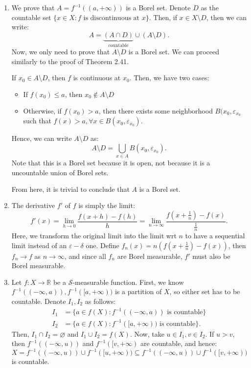 \begin{enumerate}[label=\textbf{2B.\arabic*}]
\item We prove that \( A = f^{-1}((a, +\infty)) \) is a Borel set. 
  Denote \(
  D\) as the countable set \( \{x \in X: f\text{ is discontinuous at } x\}   \).
  Then, if \( x \in X \setminus D \), then we can write:
  \[
    A = \underbrace{(A \cap D)}_{\text{countable}} \cup (A
    \setminus D)
  .\] 
  Now, we only need to prove that \( A\setminus D \) is a Borel set. We can
  proceed similarly to the proof of Theorem 2.41.

  If \( x_{0} \in A \setminus D \), then \( f \) is continuous at \( x_{0} \).
  Then, we have two cases:
  \begin{itemize}
  \item If \( f(x_{0}) \le  a \), then \( x_{0} \not\in A \setminus D \)
  \item Otherwise, if \( f(x_{0}) > a \), then there exists some neighborhood \(
    B(x_{0}, \varepsilon_{x_{0}}\) such that \( f(x) > a, \forall x \in B(x_{0},
    \varepsilon_{x_{0}}) \).
  \end{itemize}
  Hence, we can write \( A\setminus D \) as:
  \[
    A \setminus D = \bigcup_{x \in A} B(x_{0}, \varepsilon_{x_{0}})
  .\] 
  Note that this is a Borel set because it is open, not because it is a
  uncountable union of Borel sets.

  From here, it is trivial to conclude that \( A \) is a Borel set.
\item The derivative \( f' \) of \( f \) is simply the limit:
  \[
    f'(x) = \lim_{h \to 0} \frac{f(x+h)-f(h)}{h} = \lim_{n \to \infty} \frac{f
    \left( x +  \frac{1}{n} \right) - f(x) }{\frac{1}{n}}
  .\] 
  Here, we transform the original limit into the limit wrt \( n \) to have a
  sequential limit instead of an \( \varepsilon-\delta \) one. Define \(
  f_{n}(x) = n \left( f \left( x + \frac{1}{n} \right) - f(x) \right)  \), then
  \( f_{n} \to  f \) as \( n \to \infty \), and since all \( f_{n} \) are Borel
  measurable, \( f' \) must also be Borel measurable.

\item Let \( f: X \to \mathbb{R} \) be a \( \mathcal{S} \)-measurable function.
  First, we know \( f^{-1}((-\infty, a)), f^{-1}([a, +\infty)) \) is a partition
  of \( X \), so either set has to be countable. Denote \( I_{1}, I_{2} \) as
  follows:
  \begin{align*}
    I_{1} &= \{a \in f(X): f^{-1}((-\infty, a)) \text{ is countable}\}   \\
    I_{2} &= \{a \in f(X): f^{-1}([a, +\infty)) \text{ is countable}\}
  .\end{align*}
  Then, \( I_{1} \cap I_{2} = \varnothing \) and \( I_{1} \cup I_{2} = f(X) \).
  Now, take \( u \in I_{1}, v \in I_{2} \). If \( u > v \), then \(
  f^{-1}((-\infty, u)) \) and \( f^{-1}([v, +\infty) \) are countable, and
  hence:
  \[
    X = f^{-1}((-\infty, u)) \cup f^{-1}([u, +\infty))
    \subseteq f^{-1}((-\infty, u)) \cup f^{-1}([v, +\infty))
  \] is countable.


\end{enumerate}
